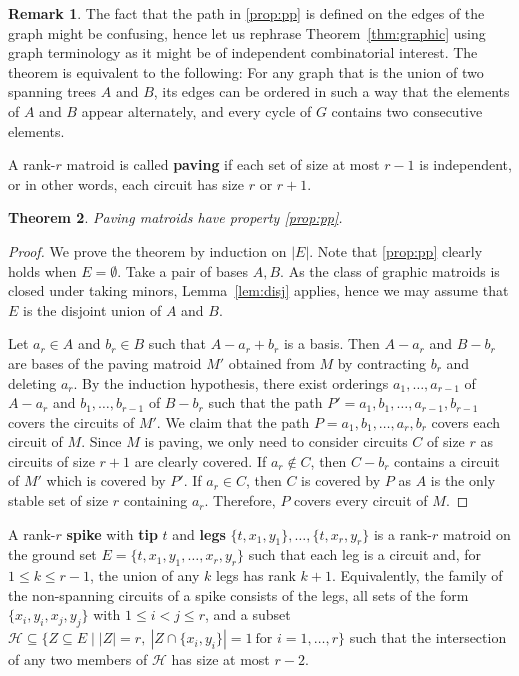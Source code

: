 \documentclass[11pt,a4paper]{article}
\theoremstyle{plain}
\newtheorem{thm}{Theorem}
\theoremstyle{definition}
\newtheorem{rem}[thm]{Remark}
\newcommand{\cH}{\mathcal{H}}
\begin{document}
\begin{rem} \label{rem:graphic}
\normalfont
The fact that the path in \ref{prop:pp} is defined on the edges of the graph might be confusing, hence let us rephrase Theorem~\ref{thm:graphic} using graph terminology as it might be of independent combinatorial interest. The theorem is equivalent to the following: For any graph that is the union of two spanning trees $A$ and $B$, its edges can be ordered in such a way that the elements of $A$ and $B$ appear alternately, and every cycle of $G$ contains two consecutive elements. 
\end{rem}

A rank-$r$ matroid is called \textbf{paving} if each set of size at most $r-1$ is independent, or in other words, each circuit has size $r$ or $r+1$. 

\begin{thm} \label{thm:paving} 
Paving matroids have property \ref{prop:pp}.
\end{thm}
\begin{proof} 
We prove the theorem by induction on $|E|$. Note that \ref{prop:pp} clearly holds when $E=\emptyset$. Take a pair of bases $A,B$. As the class of graphic matroids is closed under taking minors, Lemma~\ref{lem:disj} applies, hence we may assume that $E$ is the disjoint union of $A$ and $B$.

Let $a_r \in A$ and $b_r \in B$ such that $A-a_r+b_r$ is a basis. Then $A-a_r$ and $B-b_r$ are bases of the paving matroid $M'$ obtained from $M$ by contracting $b_r$ and deleting $a_r$. By the induction hypothesis, there exist orderings $a_1,\dots, a_{r-1}$ of $A-a_r$ and $b_1,\dots, b_{r-1}$ of $B-b_r$ such that the path $P' = a_1,b_1,\dots, a_{r-1}, b_{r-1}$ covers the circuits of $M'$. We claim that the path $P = a_1,b_1,\dots, a_r, b_r$ covers each circuit of $M$. Since $M$ is paving, we only need to consider circuits $C$ of size $r$ as circuits of size $r+1$ are clearly covered. If $a_r \not \in C$, then $C-b_r$ contains a circuit of $M'$ which is covered by $P'$. If $a_r \in C$, then $C$ is covered by $P$ as $A$ is the only stable set of size $r$ containing $a_r$. Therefore, $P$ covers every circuit of $M$.
\end{proof}

A rank-$r$ \textbf{spike} with \textbf{tip} $t$ and \textbf{legs} $\{t,x_1,y_1\}, \dots, \{t,x_r,y_r\}$ is a rank-$r$ matroid on the ground set $E=\{t,x_1,y_1,\dots, x_r,y_r\}$ such that each leg is a circuit and, for $1 \le k \le r-1$, the union of any $k$ legs has rank $k+1$. Equivalently, the family of the non-spanning circuits of a spike consists of the legs, all sets of the form $\{x_i, y_i, x_j, y_j\}$ with $1 \le i < j \le r$, and a subset $\cH \subseteq \{Z\subseteq E \mid |Z|=r,\ |Z\cap\{x_i,y_i\}|=1\ \text{for $i=1,\dots,r$}\}$ such that the intersection of any two members of $\cH$ has size at most $r-2$.
\end{document}
